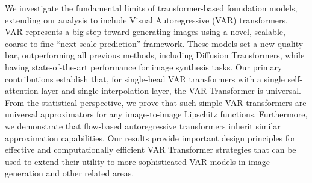 We investigate the fundamental limits of transformer-based foundation models, extending our analysis to include Visual Autoregressive (VAR) transformers. VAR represents a big step toward generating images using a novel, scalable, coarse-to-fine ``next-scale prediction'' framework. These models set a new quality bar, outperforming all previous methods, including Diffusion Transformers, while having state-of-the-art performance for image synthesis tasks. Our primary contributions establish that, for single-head VAR transformers with a single self-attention layer and single interpolation layer, the VAR Transformer is universal. From the statistical perspective, we prove that such simple VAR transformers are universal approximators for any image-to-image Lipschitz functions. Furthermore, we demonstrate that flow-based autoregressive transformers inherit similar approximation capabilities. Our results provide important design principles for effective and computationally efficient VAR Transformer strategies that can be used to extend their utility to more sophisticated VAR models in image generation and other related areas.

